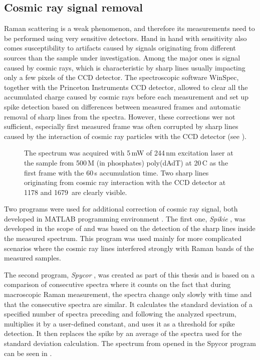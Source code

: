 \subsection{Cosmic ray signal removal}
\label{subsec:spike_removal}

Raman scattering is a weak phenomenon, and therefore its measurements need to
be performed using very sensitive detectors.
Hand in hand with sensitivity also comes susceptibility to artifacts
caused by signals originating from different sources than the sample under
investigation.
Among the major ones is signal caused by cosmic rays, which is characteristic
by sharp lines usually impacting only a few pixels of the CCD detector.
The spectroscopic software WinSpec, together with the Princeton Instruments
CCD detector, allowed to clear all the accumulated charge caused by cosmic rays
before each measurement and set up spike detection based on differences between
measured frames and automatic removal of sharp lines from the spectra.
However, these corrections wer not sufficient, especially first measured frame
was often corrupted by sharp lines caused by the interaction of cosmic ray
particles with the CCD detector
(see ).

\begin{figure}
	\centering
	
	\vspace{3mm}
	\caption[%
		UVRR spectrum containing cosmic ray signal.
	]{%
		The spectrum was acquired with 5\,mW of 244\,nm excitation laser at the
		sample from 500\,M (in phosphates) poly(dAdT) at 20\,\textdegree{}C as
		the	first frame with the 60\,s accumulation time.
		Two sharp lines originating from cosmic ray interaction with the CCD
		detector at 1178 and 1679\,\icm{} are clearly visible.
	}
	\label{\figlabel{cosmic_spikes:spectrum}}
\end{figure}

Two programs were used for additional correction of cosmic ray signal, both
developed in MATLAB programming environment
\parencite{Matlab}.
The first one, \emph{Spikie}
\parencite{Spikie2011},
was developed in the scope of
\textcite{Klener2011}
and was based on the detection of the sharp lines inside the measured spectrum.
This program was used mainly for more complicated scenarios where the cosmic
ray lines interfered strongly with Raman bands of the measured samples.

The second program, \emph{Spycor}
\parencite{Spycor2018},
was created as part of this thesis and is based on a comparison of consecutive
spectra where it counts on the fact that during macroscopic Raman measurement,
the spectra change only slowly with time and that the consecutive spectra are
similar.
It calculates the standard deviation of a specified number of spectra preceding
and following the analyzed spectrum, multiplies it by a user-defined constant,
and uses it as a threshold for spike detection.
It then replaces the spike by an average of the spectra used for the standard
deviation calculation. The spectrum from
opened in the Spycor program can be seen in
.

